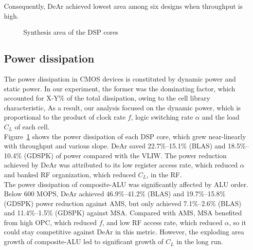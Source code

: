 {    Consequently, DeAr achieved lowest area among six designs when throughput is high.
    \vspace{\textfig}
    \begin{figure}[!ht]
        \begin{center}
        \end{center}
        \caption{Synthesis area of the DSP cores}
        \label{chart:area}
    \end{figure}

    \subsection{Power dissipation}
    The power dissipation in CMOS devices is constituted by dynamic power and static power.
    In our experiment, the former was the dominating factor, which accounted for X-Y\% of the total dissipation, 
    owing to the cell library characteristic, 
    As a result, our analysis focused on the dynamic power, 
    which is proportional to the product of clock rate $f$, logic switching rate $\alpha$ and the load $C_L$ of each cell.
    \\\indent
    Figure~\ref{chart:area} shows the power dissipation of each DSP core, 
    which grew near-linearly with throughput and various slope.
    DeAr saved 22.7\%--15.1\% (BLAS) and 18.5\%--10.4\% (GDSPK) of power compared with the VLIW.
    The power reduction achieved by DeAr was attributed to its low register access rate, which reduced $\alpha$
    and banked RF organization, which reduced $C_L$, in the RF.
    \\\indent
    The power dissipation of composite-ALU was significantly affected by ALU order.
    Below 600 MOPS, DeAr achieved 46.9\%--41.2\% (BLAS) and 19.7\%--15.8\% (GDSPK) power reduction against AMS, 
    but only achieved 7.1\%--2.6\% (BLAS) and 11.4\%--1.5\% (GDSPK) against MSA.  Compared with AMS, MSA benefited from high OPC, which reduced $f$, and low RF access rate, which reduced $\alpha$, 
    so it could stay competitive against DeAr in this metric.
    However, the exploding area growth of composite-ALU led to significant growth of $C_L$ in the long run.
}
